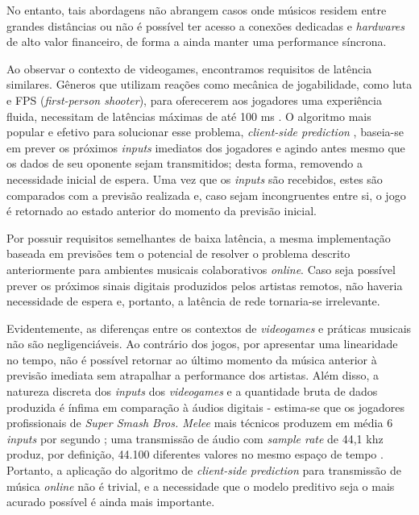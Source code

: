 No entanto, tais abordagens não abrangem casos onde músicos residem entre grandes distâncias ou não é possível ter acesso a conexões dedicadas e \textit{hardwares} de alto valor financeiro, de forma a ainda manter uma performance síncrona.

Ao observar o contexto de videogames, encontramos requisitos de latência similares. Gêneros que utilizam reações como mecânica de jogabilidade, como luta e FPS (\textit{first-person shooter}), para oferecerem aos jogadores uma experiência fluida, necessitam de latências máximas de até 100 ms \cite{pubnub}. O algoritmo mais popular e efetivo para solucionar esse problema, \textit{client-side prediction} \cite{client-side-prediction}, baseia-se em prever os próximos \textit{inputs} imediatos dos jogadores e agindo antes mesmo que os dados de seu oponente sejam transmitidos; desta forma, removendo a necessidade inicial de espera. Uma vez que os \textit{inputs} são recebidos, estes são comparados com a previsão realizada e, caso sejam incongruentes entre si, o jogo é retornado ao estado anterior do momento da previsão inicial.

Por possuir requisitos semelhantes de baixa latência, a mesma implementação baseada em previsões tem o potencial de resolver o problema descrito anteriormente para ambientes musicais colaborativos \textit{online}. Caso seja possível prever os próximos sinais digitais produzidos pelos artistas remotos, não haveria necessidade de espera e, portanto, a latência de rede tornaria-se irrelevante.

Evidentemente, as diferenças entre os contextos de \textit{videogames} e práticas musicais não são negligenciáveis. Ao contrário dos jogos, por apresentar uma linearidade no tempo, não é possível retornar ao último momento da música anterior à previsão imediata sem atrapalhar a performance dos artistas. Além disso, a natureza discreta dos \textit{inputs} dos \textit{videogames} e a quantidade bruta de dados produzida é ínfima em comparação à áudios digitais - estima-se que os jogadores profissionais de \textit{Super Smash Bros. Melee} mais técnicos produzem em média 6 \textit{inputs} por segundo \cite{melee_inputs_per_second}; uma transmissão de áudio com \textit{sample rate} de 44,1 khz produz, por definição, 44.100 diferentes valores no mesmo espaço de tempo \cite{jukebox_dimension}. Portanto, a aplicação do algoritmo de \textit{client-side prediction} para transmissão de música \textit{online} não é trivial, e a necessidade que o modelo preditivo seja o mais acurado possível é ainda mais importante.

